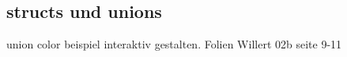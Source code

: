 \subsection{structs und unions}

union color beispiel interaktiv gestalten. Folien Willert 02b seite 9-11 

